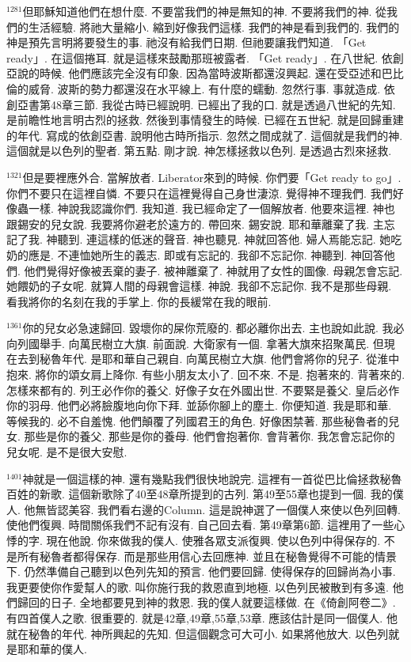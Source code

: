 \documentclass{book}
\begin{document}
$^{1281}$但耶穌知道他們在想什麼.
不要當我們的神是無知的神.
不要將我們的神.
從我們的生活經驗.
將祂大量縮小.
縮到好像我們這樣.
我們的神是看到我們的.
我們的神是預先言明將要發生的事.
祂沒有給我們日期.
但祂要讓我們知道.
「Get ready」.
在這個捲耳.
就是這樣來鼓勵那班被露者.
「Get ready」.
在八世紀.
依創亞說的時候.
他們應該完全沒有印象.
因為當時波斯都還沒興起.
還在受亞述和巴比倫的威脅.
波斯的勢力都還沒在水平線上.
有什麼的蠕動.
忽然行事.
事就造成.
依創亞書第48章三節.
我從古時已經說明.
已經出了我的口.
就是透過八世紀的先知.
是前瞻性地言明古烈的拯救.
然後到事情發生的時候.
已經在五世紀.
就是回歸重建的年代.
寫成的依創亞書.
說明他古時所指示.
忽然之間成就了.
這個就是我們的神.
這個就是以色列的聖者.
第五點.
剛才說.
神怎樣拯救以色列.
是透過古烈來拯救.

$^{1321}$但是要裡應外合.
當解放者.
Liberator來到的時候.
你們要「Get ready to go」.
你們不要只在這裡自憐.
不要只在這裡覺得自己身世淒涼.
覺得神不理我們.
我們好像蟲一樣.
神說我認識你們.
我知道.
我已經命定了一個解放者.
他要來這裡.
神也跟錫安的兒女說.
我要將你避老於遠方的.
帶回來.
錫安說.
耶和華離棄了我.
主忘記了我.
神聽到.
連這樣的低迷的聲音.
神也聽見.
神就回答他.
婦人焉能忘記.
她吃奶的應是.
不連恤她所生的義志.
即或有忘記的.
我卻不忘記你.
神聽到.
神回答他們.
他們覺得好像被丟棄的妻子.
被神離棄了.
神就用了女性的圖像.
母親怎會忘記.
她餵奶的子女呢.
就算人間的母親會這樣.
神說.
我卻不忘記你.
我不是那些母親.
看我將你的名刻在我的手掌上.
你的長緩常在我的眼前.

$^{1361}$你的兒女必急速歸回.
毀壞你的屎你荒廢的.
都必離你出去.
主也說如此說.
我必向列國舉手.
向萬民樹立大旗.
前面說.
大衛家有一個.
拿著大旗來招聚萬民.
但現在去到秘魯年代.
是耶和華自己親自.
向萬民樹立大旗.
他們會將你的兒子.
從淮中抱來.
將你的頌女肩上降你.
有些小朋友太小了.
回不來.
不是.
抱著來的.
背著來的.
怎樣來都有的.
列王必作你的養父.
好像子女在外國出世.
不要緊是養父.
皇后必作你的羽母.
他們必將臉腹地向你下拜.
並舔你腳上的塵土.
你便知道.
我是耶和華.
等候我的.
必不自羞愧.
他們顛覆了列國君王的角色.
好像困禁著.
那些秘魯者的兒女.
那些是你的養父.
那些是你的養母.
他們會抱著你.
會背著你.
我怎會忘記你的兒女呢.
是不是很大安慰.

$^{1401}$神就是一個這樣的神.
還有幾點我們很快地說完.
這裡有一首從巴比倫拯救秘魯百姓的新歌.
這個新歌除了40至48章所提到的古列.
第49至55章也提到一個.
我的僕人.
他無皆認美容.
我們看右邊的Column.
這是說神選了一個僕人來使以色列回轉.
使他們復興.
時間關係我們不記有沒有.
自己回去看.
第49章第6節.
這裡用了一些心悸的字.
現在他說.
你來做我的僕人.
使雅各眾支派復興.
使以色列中得保存的.
不是所有秘魯者都得保存.
而是那些用信心去回應神.
並且在秘魯覺得不可能的情景下.
仍然準備自己聽到以色列先知的預言.
他們要回歸.
使得保存的回歸尚為小事.
我更要使你作愛幫人的歌.
叫你施行我的救恩直到地極.
以色列民被散到有多遠.
他們歸回的日子.
全地都要見到神的救恩.
我的僕人就要這樣做.
在《倚創阿卷二》.
有四首僕人之歌.
很重要的.
就是42章,49章,55章,53章.
應該估計是同一個僕人.
他就在秘魯的年代.
神所興起的先知.
但這個觀念可大可小.
如果將他放大.
以色列就是耶和華的僕人.
\end{document}

